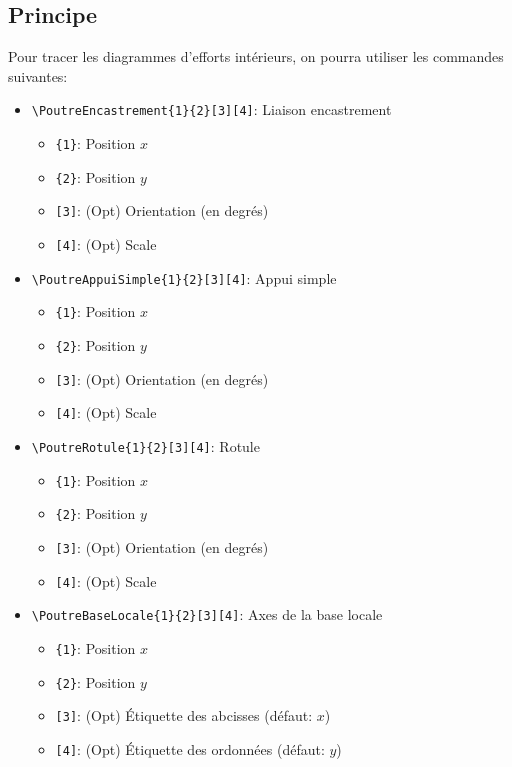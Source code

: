 \documentclass[11pt]{ltxdockit}[2010/09/26]
\begin{document}
\subsection{Principe}
Pour tracer les diagrammes d'efforts intérieurs, on pourra utiliser les commandes suivantes:

\vspace{1em}
\begin{itemize}
\item \verb!\PoutreEncastrement{1}{2}[3][4]!: Liaison encastrement
\begin{itemize}
\item \verb!{1}!: Position $x$
\item \verb!{2}!: Position $y$
\item \verb![3]!: (Opt) Orientation (en degrés)
\item \verb![4]!: (Opt) Scale
\end{itemize}

\vspace{1em}
\item \verb!\PoutreAppuiSimple{1}{2}[3][4]!: Appui simple
\begin{itemize}
\item \verb!{1}!: Position $x$
\item \verb!{2}!: Position $y$
\item \verb![3]!: (Opt) Orientation (en degrés)
\item \verb![4]!: (Opt) Scale
\end{itemize}

\vspace{1em}
\item \verb!\PoutreRotule{1}{2}[3][4]!: Rotule
\begin{itemize}
\item \verb!{1}!: Position $x$
\item \verb!{2}!: Position $y$
\item \verb![3]!: (Opt) Orientation (en degrés)
\item \verb![4]!: (Opt) Scale
\end{itemize}

\vspace{1em}
\item \verb!\PoutreBaseLocale{1}{2}[3][4]!: Axes de la base locale
\begin{itemize}
\item \verb!{1}!: Position $x$
\item \verb!{2}!: Position $y$
\item \verb![3]!: (Opt) Étiquette des abcisses (défaut: $x$)
\item \verb![4]!: (Opt) Étiquette des ordonnées (défaut: $y$)
\end{itemize}


\end{itemize}
\end{document}
